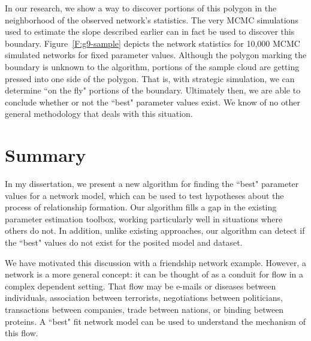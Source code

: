 \documentclass[12pt]{article}
\begin{document}
In our research, we show a way to discover portions of this polygon
in the neighborhood of the observed network's statistics.  
The very MCMC simulations used to estimate the 
slope described earlier can in fact be used to discover this boundary.  
Figure~\ref{F:g9-sample} depicts the network statistics
for 10,000 MCMC simulated networks for fixed parameter values.
Although the polygon marking the boundary is unknown to the algorithm, portions of the sample cloud
are getting pressed into one side of the polygon.
That is, with strategic simulation,
we can determine ``on the fly"
portions of the boundary.
Ultimately then, we are able to conclude whether or not the ``best" parameter values exist.
We know of no other general methodology that deals with this situation.

\section{Summary}
In my dissertation, we present a new algorithm for finding the ``best" parameter values for a
network model, which can be used to test hypotheses about the process of relationship formation.  
Our algorithm fills a gap in the existing parameter estimation toolbox, 
working particularly well in situations where others do not.   In addition, unlike existing approaches, our algorithm can
detect if the ``best" values do not exist for the posited model and dataset.

 

We have motivated this discussion with a friendship network example.  However, a network is
a more general concept: it can be thought of as a conduit for flow in a complex dependent setting.  That flow
may be e-mails or diseases between individuals, association between
terrorists,  negotiations between politicians,
transactions between companies,
trade between nations,
or binding between proteins.
A ``best" fit network model can be used to understand the mechanism of this flow.

\end{document}
